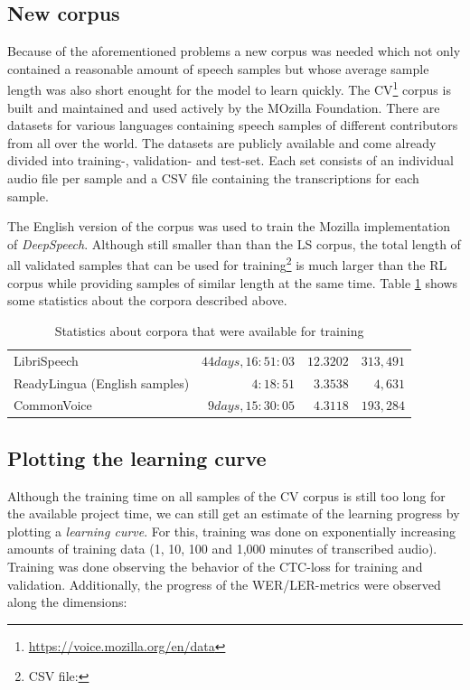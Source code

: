 \subsection{New corpus}

Because of the aforementioned problems a new corpus was needed which not only contained a reasonable amount of speech samples but whose average sample length was also short enought for the model to learn quickly. The \ac{CV}\footnote{\url{https://voice.mozilla.org/en/data}} corpus is built and maintained and used actively by the MOzilla Foundation. There are datasets for various languages containing speech samples of different contributors from all over the world. The datasets are publicly available and come already divided into training-, validation- and test-set. Each set consists of an individual audio file per sample and a CSV file containing the transcriptions for each sample.

The English version of the corpus was used to train the Mozilla implementation of  \textit{DeepSpeech}. Although still smaller than than the \ac{LS} corpus, the total length of all validated samples that can be used for training\footnote{CSV file: } is much larger than the \ac{RL} corpus while providing samples of similar length at the same time. Table \ref{corpora_stats} shows some statistics about the corpora described above.

\begin{table}[!htbp]
	\centering
	\begin{tabular}{|l|r|r|r|}
		\hline
		\thead{Corpus} & \thead{total audio length} & \thead{avg sample length} & \thead{\# samples} \\
		\hline
		LibriSpeech & $44 days, 16:51:03$ & $12.3202$ & $313,491$ \\ 
		ReadyLingua (English samples) & $4:18:51$ & $3.3538$ & $4,631$ \\ 
		CommonVoice & $9 days, 15:30:05$ & $4.3118$ & $193,284$ \\ 
		\hline
	\end{tabular}
	\caption{Statistics about corpora that were available for training}
	\label{corpora_stats}
\end{table}

\subsection{Plotting the learning curve}

Although the training time on all samples of the \ac{CV} corpus is still too long for the available project time, we can still get an estimate of the learning progress by plotting a \textit{learning curve}. For this, training was done on exponentially increasing amounts of training data (1, 10, 100 and 1,000 minutes of transcribed audio). Training was done observing the behavior of the \ac{CTC}-loss for training and validation. Additionally, the progress of the \ac{WER}/\ac{LER}-metrics were observed along the dimensions:

